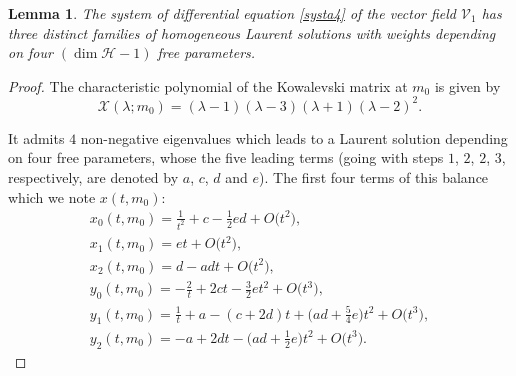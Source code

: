 \documentclass[10pt,a4paper]{amsart}
\numberwithin{equation}{section}
\newtheorem{Lemma}[Theorem]{Lemma}
\begin{document}
 \begin{Lemma}
The system of differential equation \eqref{systa4} of the vector
field $\mathcal{V}_1$ has three distinct families of homogeneous
Laurent solutions with weights depending on four $(\dim\mathcal{H}-1)$ free parameters.
\end{Lemma}
\begin{proof}

The characteristic polynomial of the Kowalevski matrix at $m_0$ is
given by
 \[\mathcal{X}( \lambda;m_0)= ( \lambda-1 ) ( \lambda-3 ) ( \lambda+1
 )( \lambda-2 ) ^{2}.\]

 It admits $4$ non-negative eigenvalues which leads
to a Laurent solution depending on four free parameters, whose the
five leading terms (going with steps $1$, $2$, $2$, $3$, respectively, are
denoted by $a$, $c$, $d$ and $e$). The first four terms of this balance
which we note $x(t,m_0)$:
\begin{gather}
 x_0(t,m_0) = \frac{1}{t^2}+c-\frac{1}{2}ed+O\bigl(t^2\bigr), \nonumber\\
 x_1(t,m_0) = et+O\bigl(t^2\bigr), \nonumber\\
 x_2(t,m_0) = d-adt+O\bigl(t^2\bigr), \nonumber\\
 y_0(t,m_0) = -\frac{2}{t}+2ct-\frac{3}{2}et^2+O\bigl(t^3\bigr), \nonumber\\
 y_1(t,m_0) = \frac{1}{t}+a-(c+2d)t+\biggl(ad+\frac{5}{4}e \biggr)t^2+O\bigl(t^3\bigr),\nonumber\\
 y_2(t,m_0) = -a+2dt-\biggl(ad+\frac{1}{2}e\biggr)t^2+O\bigl(t^3 \bigr).\label{balancemainm0}
\end{gather}


\end{proof}
\end{document}
